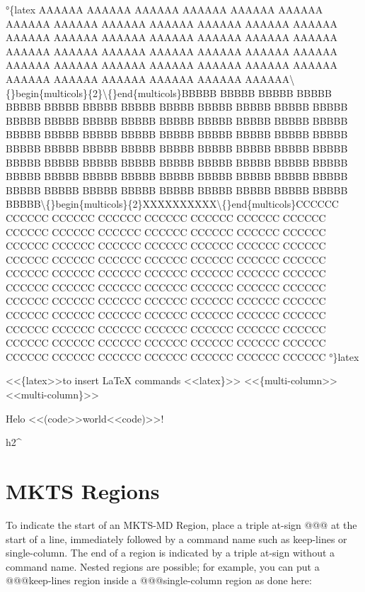 
°\{latex
AAAAAA AAAAAA AAAAAA AAAAAA AAAAAA AAAAAA AAAAAA AAAAAA AAAAAA AAAAAA AAAAAA AAAAAA
AAAAAA AAAAAA AAAAAA AAAAAA AAAAAA AAAAAA AAAAAA AAAAAA AAAAAA AAAAAA AAAAAA AAAAAA
AAAAAA AAAAAA AAAAAA AAAAAA AAAAAA AAAAAA AAAAAA AAAAAA AAAAAA AAAAAA AAAAAA AAAAAA
AAAAAA AAAAAA AAAAAA AAAAAA\textbackslash\{\}begin\{multicols\}\{2\}\textbackslash\{\}end\{multicols\}BBBBB BBBBB BBBBB BBBBB
BBBBB BBBBB BBBBB BBBBB BBBBB BBBBB BBBBB BBBBB BBBBB BBBBB BBBBB BBBBB BBBBB BBBBB BBBBB BBBBB BBBBB BBBBB BBBBB BBBBB BBBBB
BBBBB BBBBB BBBBB BBBBB BBBBB BBBBB BBBBB BBBBB BBBBB BBBBB BBBBB BBBBB BBBBB BBBBB BBBBB BBBBB BBBBB BBBBB BBBBB BBBBB BBBBB
BBBBB BBBBB BBBBB BBBBB BBBBB BBBBB BBBBB BBBBB BBBBB BBBBB BBBBB BBBBB BBBBB BBBBB BBBBB BBBBB BBBBB BBBBB BBBBB BBBBB BBBBB
BBBBB\textbackslash\{\}begin\{multicols\}\{2\}XXXXXXXXXX\textbackslash\{\}end\{multicols\}CCCCCC CCCCCC CCCCCC CCCCCC CCCCCC CCCCCC CCCCCC CCCCCC CCCCCC CCCCCC
CCCCCC CCCCCC CCCCCC CCCCCC CCCCCC CCCCCC CCCCCC CCCCCC CCCCCC CCCCCC CCCCCC CCCCCC CCCCCC CCCCCC CCCCCC CCCCCC CCCCCC
CCCCCC CCCCCC CCCCCC CCCCCC CCCCCC CCCCCC CCCCCC CCCCCC CCCCCC CCCCCC CCCCCC CCCCCC CCCCCC CCCCCC CCCCCC CCCCCC CCCCCC
CCCCCC CCCCCC CCCCCC CCCCCC CCCCCC CCCCCC CCCCCC CCCCCC CCCCCC CCCCCC CCCCCC CCCCCC CCCCCC CCCCCC CCCCCC CCCCCC CCCCCC
CCCCCC CCCCCC CCCCCC CCCCCC CCCCCC CCCCCC CCCCCC CCCCCC CCCCCC CCCCCC CCCCCC CCCCCC CCCCCC CCCCCC CCCCCC CCCCCC CCCCCC
°\}latex\mktsShowpar\par
<<\{latex>>to insert LaTeX commands
<<latex\}>>
<<\{multi-column>>
<<multi-column\}>>\mktsShowpar\par
Helo <<(code>>world<<code)>>!\mktsShowpar\par
\begin{multicols}{2}h2\textasciicircum{}\mktsShowpar\par
\end{multicols}
\section{MKTS Regions 
}
\begin{multicols}{2}To indicate the start of an MKTS-MD Region, place a triple at-sign {\mktsStyleCode{}@@@}
at the start of a line, immediately followed by a command name such as
{\mktsStyleCode{}keep-lines} or {\mktsStyleCode{}single-column}. The end of a region is indicated by a
triple at-sign without a command name. Nested regions are possible; for example,
you can put a {\mktsStyleCode{}@@@keep-lines} region inside a {\mktsStyleCode{}@@@single-column} region as
done here:\mktsShowpar\par
\end{multicols}
